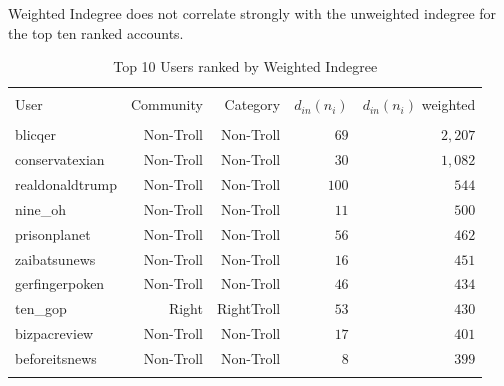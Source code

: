 \documentclass[12pt, titlepage=true, toc=bib]{scrartcl}
\begin{document}
Weighted Indegree does not correlate strongly with the unweighted indegree for the top ten ranked accounts.

\begin{table}[ht] \centering 
  \begin{tabular*}{.95\linewidth}{@{\extracolsep{\fill}} lrrrr} 
\\[-1.8ex]\hline 
\hline \\[-1.8ex] 
User & Community & Category & \( d_{in}(n_{i}) \) & \( d_{in}(n_{i}) \) weighted \\ 
\hline \\[-1.8ex] 
blicqer & Non-Troll & Non-Troll & $69$ & $2,207$ \\ 
conservatexian & Non-Troll & Non-Troll & $30$ & $1,082$ \\ 
realdonaldtrump & Non-Troll & Non-Troll & $100$ & $544$ \\ 
nine\_oh & Non-Troll & Non-Troll & $11$ & $500$ \\ 
prisonplanet & Non-Troll & Non-Troll & $56$ & $462$ \\ 
zaibatsunews & Non-Troll & Non-Troll & $16$ & $451$ \\ 
gerfingerpoken & Non-Troll & Non-Troll & $46$ & $434$ \\ 
ten\_gop & Right & RightTroll & $53$ & $430$ \\ 
bizpacreview & Non-Troll & Non-Troll & $17$ & $401$ \\ 
beforeitsnews & Non-Troll & Non-Troll & $8$ & $399$ \\ 
\hline \\[-1.8ex] 
\end{tabular*} 
\caption{Top 10 Users ranked by Weighted Indegree} 
  \label{tab:win} 
\end{table}
\end{document}
